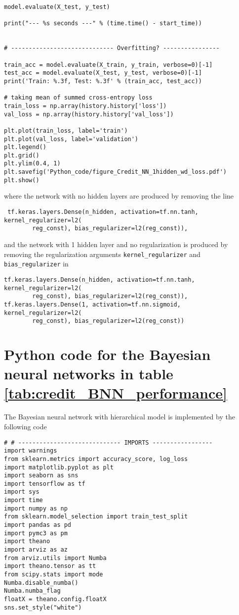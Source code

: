 \begin{appendices}
\begin{lstlisting}
model.evaluate(X_test, y_test)

print("--- %s seconds ---" % (time.time() - start_time))


# ----------------------------- Overfitting? ----------------

train_acc = model.evaluate(X_train, y_train, verbose=0)[-1]
test_acc = model.evaluate(X_test, y_test, verbose=0)[-1]
print('Train: %.3f, Test: %.3f' % (train_acc, test_acc))

# taking mean of summed cross-entropy loss
train_loss = np.array(history.history['loss'])
val_loss = np.array(history.history['val_loss'])

plt.plot(train_loss, label='train')
plt.plot(val_loss, label='validation')
plt.legend()
plt.grid()
plt.ylim(0.4, 1)
plt.savefig('Python_code/figure_Credit_NN_1hidden_wd_loss.pdf')
plt.show()

\end{lstlisting}
where the network with no hidden layers are produced by removing the line
\begin{lstlisting}
 tf.keras.layers.Dense(n_hidden, activation=tf.nn.tanh, kernel_regularizer=l2(
        reg_const), bias_regularizer=l2(reg_const)),
\end{lstlisting}
and the network with 1 hidden layer and no regularization is produced by removing the regularization arguments \texttt{kernel\_regularizer} and \texttt{bias\_regularizer} in 
\begin{lstlisting}
tf.keras.layers.Dense(n_hidden, activation=tf.nn.tanh, kernel_regularizer=l2(
        reg_const), bias_regularizer=l2(reg_const)),
tf.keras.layers.Dense(1, activation=tf.nn.sigmoid, kernel_regularizer=l2(
        reg_const), bias_regularizer=l2(reg_const))
\end{lstlisting}

\section{Python code for the Bayesian neural networks in table \ref{tab:credit_BNN_performance}} \label{app:Credit_BNN}
The Bayesian neural network with hierarchical model is implemented by the following code
\begin{lstlisting}
# # ----------------------------- IMPORTS -----------------
import warnings
from sklearn.metrics import accuracy_score, log_loss
import matplotlib.pyplot as plt
import seaborn as sns
import tensorflow as tf
import sys
import time
import numpy as np
from sklearn.model_selection import train_test_split
import pandas as pd
import pymc3 as pm
import theano
import arviz as az
from arviz.utils import Numba
import theano.tensor as tt
from scipy.stats import mode
Numba.disable_numba()
Numba.numba_flag
floatX = theano.config.floatX
sns.set_style("white")



\end{lstlisting}
\end{appendices}
